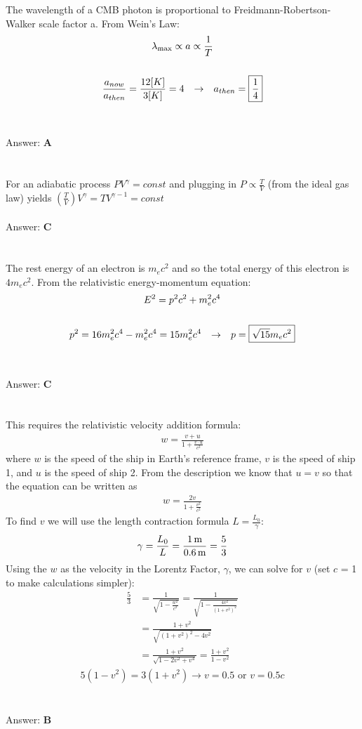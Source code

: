 \documentclass[12pt]{article}
\newcommand{\Answer}[1]{Answer: \textbf{#1}}
\newcommand{\Problem}[3]{
    \setcounter{section}{#1}
    \addtocounter{section}{-1}
    \section{}
    #3\\\\
    \Answer{#2}
}
\begin{document}
\Problem{20}{A}{%
The wavelength of a CMB photon is proportional to Freidmann-Robertson-Walker scale factor a. From Wein's Law:
\begin{gather}
\lambda_{\max} \propto a \propto \frac{1}{T} \\
\nonumber\\
\frac{a_{now}}{a_{then}} = \frac{12 [K]}{3 [K]} = 4\hspace{.1in} \rightarrow \hspace{.1in} a_{then} = \boxed{\frac{1}{4}}\nonumber
\end{gather}
}


\Problem{21}{C}{%
For an adiabatic process $P V^\gamma = const$ and plugging in $P \propto \frac{T}{V}$ (from the ideal gas law) yields $\left(\frac{T}{V}\right) V^\gamma = T V^{\gamma-1}= const$
}

\Problem{22}{C}{%
The rest energy of an electron is $m_e c^2$ and so the total energy of this electron is $4 m_e c^2$. From the relativistic energy-momentum equation:
\begin{gather}
E^2 = p^2c^2 + m_e^2 c^4\\
\nonumber\\
p^2 = 16 m_e^2 c^4 - m_e^2 c^4 = 15 m_e^2 c^4\hspace{.1in} \rightarrow \hspace{.1in} p = \boxed{\sqrt{15}m_e c^2}\nonumber
\end{gather}
}

\Problem{23}{B}{%
This requires the relativistic velocity addition formula:
\begin{align}
w = \frac{v + u}{1+\frac{v \cdot u}{c^{2}}}
\end{align}
where $w$ is the speed of the ship in Earth's reference frame, $v$ is the speed of ship 1, and $u$ is the speed of ship 2. From the description we know that $u = v$ so that the equation can be written as
\begin{align}
w = \frac{2v}{1+\frac{v^2}{c^{2}}}\nonumber
\end{align}
To find $v$ we will use the length contraction formula $L = \frac{L_{0}}{\gamma}$:
\begin{align}
\gamma = \frac{L_{0}}{L} = \frac{1\,\text{m}}{0.6\,\text{m}} = \frac{5}{3}\nonumber
\end{align}
Using the $w$ as the velocity in the Lorentz Factor, $\gamma$, we can solve for $v$ (set $c$ = 1 to make calculations simpler):
\begin{align}
\frac{5}{3} &= \frac{1}{\sqrt{1- \frac{w^2}{c^{2}}}} = \frac{1}{\sqrt{1- \frac{4v^{2}}{{(1+v^{2})}^{2}}}}\nonumber\\
&= \frac{1+v^{2}}{\sqrt{{(1+v^{2})}^2 - 4v^{2}}}\nonumber\\
&= \frac{1+v^{2}}{\sqrt{1-2v^2+v^4}} = \frac{1+v^{2}}{1-v^2}\nonumber
\end{align}
\begin{align}
5(1-v^2) = 3(1+v^2) \rightarrow v = 0.5 \text{ or } \boxed{v = 0.5 c}\nonumber
\end{align}
}
\end{document}
